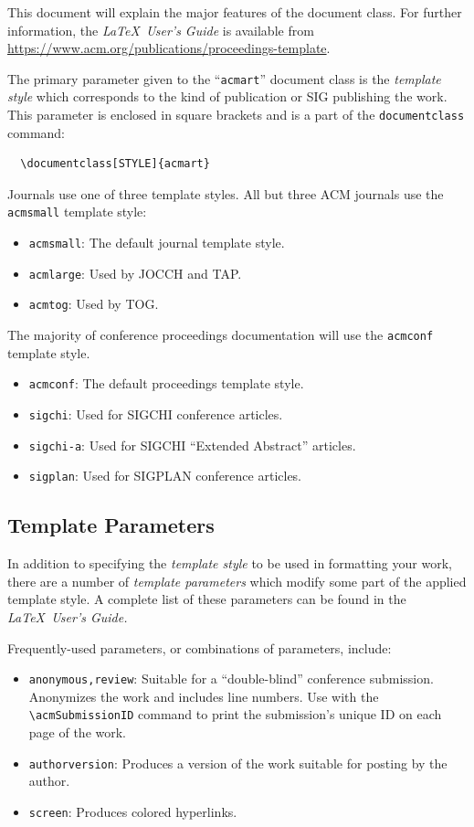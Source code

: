 \documentclass[sigconf]{acmart}
\begin{document}
This document will explain the major features of the document
class. For further information, the {\itshape \LaTeX\ User's Guide} is
available from
\url{https://www.acm.org/publications/proceedings-template}.

The primary parameter given to the ``\verb|acmart|'' document class is
the {\itshape template style} which corresponds to the kind of publication
or SIG publishing the work. This parameter is enclosed in square
brackets and is a part of the {\verb|documentclass|} command:
\begin{verbatim}
  \documentclass[STYLE]{acmart}
\end{verbatim}

Journals use one of three template styles. All but three ACM journals
use the {\verb|acmsmall|} template style:
\begin{itemize}
\item {\verb|acmsmall|}: The default journal template style.
\item {\verb|acmlarge|}: Used by JOCCH and TAP.
\item {\verb|acmtog|}: Used by TOG.
\end{itemize}

The majority of conference proceedings documentation will use the {\verb|acmconf|} template style.
\begin{itemize}
\item {\verb|acmconf|}: The default proceedings template style.
\item{\verb|sigchi|}: Used for SIGCHI conference articles.
\item{\verb|sigchi-a|}: Used for SIGCHI ``Extended Abstract'' articles.
\item{\verb|sigplan|}: Used for SIGPLAN conference articles.
\end{itemize}

\subsection{Template Parameters}

In addition to specifying the {\itshape template style} to be used in
formatting your work, there are a number of {\itshape template parameters}
which modify some part of the applied template style. A complete list
of these parameters can be found in the {\itshape \LaTeX\ User's Guide.}

Frequently-used parameters, or combinations of parameters, include:
\begin{itemize}
\item {\verb|anonymous,review|}: Suitable for a ``double-blind''
  conference submission. Anonymizes the work and includes line
  numbers. Use with the \verb|\acmSubmissionID| command to print the
  submission's unique ID on each page of the work.
\item{\verb|authorversion|}: Produces a version of the work suitable
  for posting by the author.
\item{\verb|screen|}: Produces colored hyperlinks.
\end{itemize}
\end{document}
